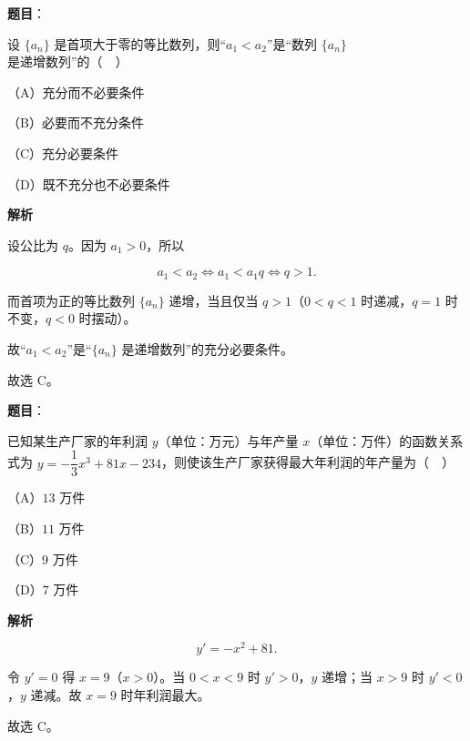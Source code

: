 \begin{answer}

\textbf{题目}：

设 $\{a_n\}$ 是首项大于零的等比数列，则“$a_1<a_2$”是“数列 $\{a_n\}$ 是递增数列”的（　）

（A）充分而不必要条件

（B）必要而不充分条件

（C）充分必要条件

（D）既不充分也不必要条件

\textbf{解析}

设公比为 $q$。因为 $a_1>0$，所以

\nopagebreak[4]
\[a_1<a_2\iff a_1<a_1q\iff q>1.\]

而首项为正的等比数列 $\{a_n\}$ 递增，当且仅当 $q>1$（$0<q<1$ 时递减，$q=1$ 时不变，$q<0$ 时摆动）。

故“$a_1<a_2$”是“$\{a_n\}$ 是递增数列”的充分必要条件。

故选 C。


\end{answer}
\begin{answer}

\textbf{题目}：

已知某生产厂家的年利润 $y$（单位：万元）与年产量 $x$（单位：万件）的函数关系式为 $y=-\dfrac13x^3+81x-234$，则使该生产厂家获得最大年利润的年产量为（　）

（A）$13$ 万件

（B）$11$ 万件

（C）$9$ 万件

（D）$7$ 万件

\textbf{解析}

\nopagebreak[4]
\[y'=-x^2+81.\]

令 $y'=0$ 得 $x=9$（$x>0$）。当 $0<x<9$ 时 $y'>0$，$y$ 递增；当 $x>9$ 时 $y'<0$，$y$ 递减。故 $x=9$ 时年利润最大。

故选 C。


\end{answer}
